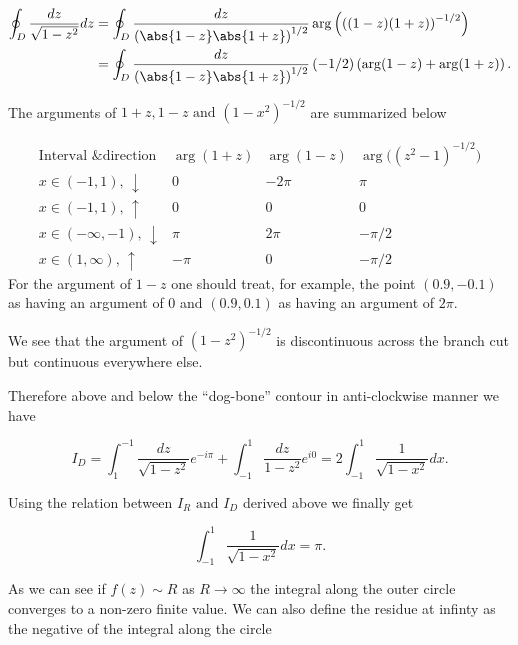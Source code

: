 \documentclass[english,a4paper,12pt]{report}
\begin{document}
{\begin{equation}
    \begin{aligned} 
    \oint_{D} \frac{dz}{\sqrt{1-z^2} }dz &= \oint_{D} \frac{dz}{\left( \abs{1-z}\abs{1+z}   \right)^{1/2} }\arg \left( \left( (1-z)(1+z) \right)^{-1/2}  \right) \\
    &= \oint_{D} \frac{dz}{\left( \abs{1-z}\abs{1+z}   \right)^{1/2} } \left( -1/2 \right) \left( \arg (1-z) + \arg (1+z) \right). 
    \end{aligned} 
\end{equation}

The arguments of \(1+z,1-z \text { and } (1-x^2)^{-1/2} \) are summarized below

\[
\begin{array}{c|ccc}
\text{Interval \& direction} 
  & \arg(1+z) 
  & \arg(1-z) 
  & \arg\bigl((z^2-1)^{-1/2}\bigr)
\\\hline
x\in(-1,1),\,\downarrow 
  & 0 
  & -2\pi  
  & \pi 
\\[6pt]
x\in(-1,1),\,\uparrow   
  & 0 
  & 0
  & 0
\\[6pt]
x\in(-\infty,-1),\,\downarrow 
  & \pi 
  & 2\pi 
  & -\pi /2
\\[6pt]
x\in(1,\infty),\,\uparrow 
  & -\pi 
  & 0 
  & -\pi /2
\end{array}
\]
For the argument of \(1-z\) one should treat, for example, the point \((0.9,-0.1)\) as having an argument of \(0\) and \((0.9,0.1)\) as having an argument of \(2\pi \).

We see that the argument of \((1-z^2)^{-1/2} \) is discontinuous across the branch cut but continuous everywhere else. 

Therefore above and below the ``dog-bone'' contour in anti-clockwise manner we have 

\begin{equation}
    I_{D} = \int_{1}^{-1} \frac{dz}{\sqrt{1-z^2} } e^{-i\pi } + \int_{-1}^{1} \frac{dz}{1-z^2} e^{i0 } = 2 \int_{-1}^{1} \frac{1}{\sqrt{1-x^2} } dx.  
\end{equation}

Using the relation between \(I_{R} \text { and } I_{D} \) derived above we finally get 

\begin{equation}
    \int_{-1}^{1} \frac{1}{\sqrt{1-x^2} }dx = \pi .  
\end{equation}

As we can see if \(f(z) \sim R\) as \(R \to \infty\) the integral along the outer circle converges to a non-zero finite value. We can also define the residue at infinty as the negative of the integral along the circle

}
\end{document}
